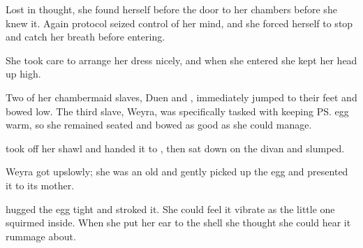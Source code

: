 \begin{comment}
\subsection{\Tiroco{} in her room}
\end{comment}


Lost in thought, she found herself before the door to her chambers before she knew it. 
Again protocol seized control of her mind, and she forced herself to stop and catch her breath before entering. 

She took care to arrange her dress nicely, and when she entered she kept her head up high. 

Two of her chambermaid slaves, Duen and \Piacet, immediately jumped to their feet and bowed low. 
The third slave, Weyra, was specifically tasked with keeping \ps{\Tiroco}{} egg warm, so she remained seated and bowed as good as she could manage. 

\Tiroco{} took off her shawl and handed it to \Piacet, then sat down on the divan and slumped. 


Weyra got up\dash slowly; she was an old \sphyle\dash and gently picked up the egg and presented it to its mother. 





\Tiroco{} hugged the egg tight and stroked it. 
She could feel it vibrate as the little one squirmed inside. 
When she put her ear to the shell she thought she could hear it rummage about. 

